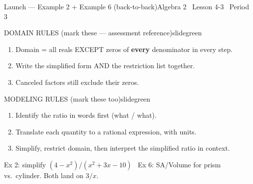\documentclass[aspectratio=169, 11pt]{beamer}
\begin{document}
\begin{frame}{Launch --- Example 2 + Example 6 (back-to-back)}{Algebra 2 \textperiodcentered\ Lesson 4-3 \textperiodcentered\ Period 3}
\vspace{0.15cm}
\begin{projcard}{DOMAIN RULES (mark these --- assessment reference)}{slidegreen}
\begin{enumerate}
  \setlength{\itemsep}{0pt}
  \item Domain = all reals EXCEPT zeros of \textbf{every} denominator in every step.
  \item Write the simplified form AND the restriction list together.
  \item Canceled factors still exclude their zeros.
\end{enumerate}
\end{projcard}
\vspace{-0.1cm}
\begin{projcard}{MODELING RULES (mark these too)}{slidegreen}
\begin{enumerate}
  \setlength{\itemsep}{0pt}
  \item Identify the ratio in words first (what / what).
  \item Translate each quantity to a rational expression, with units.
  \item Simplify, restrict domain, then interpret the simplified ratio in context.
\end{enumerate}
\end{projcard}

\vspace{0.05cm}
\small\textcolor{slidegray}{Ex 2: simplify \((4-x^2)/(x^2+3x-10)\) \textbullet\ Ex 6: SA/Volume for prism vs.\ cylinder. Both land on \(3/x\).}
\end{frame}
\end{document}
